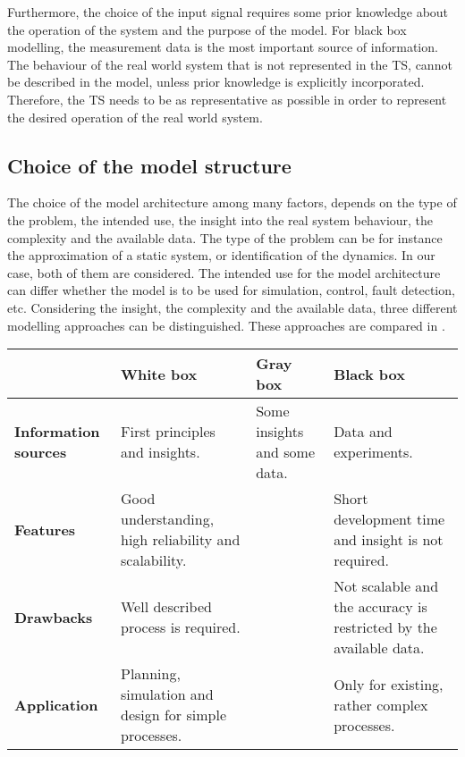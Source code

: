 Furthermore, the choice of the input signal requires some prior knowledge about the operation of the system and the purpose of the model. For black box modelling, the measurement data is the most important source of information. The behaviour of the real world system that is not represented in the TS, cannot be described in the model, unless prior knowledge is explicitly incorporated. Therefore, the TS needs to be as representative as possible in order to represent the desired operation of the real world system. 

\subsection{Choice of the model structure}
\label{choice_of_the_model_architecture}

The choice of the model architecture among many factors, depends on the type of the problem, the intended use, the insight into the real system behaviour, the complexity and the available data. The type of the problem can be for instance the approximation of a static system, or identification of the dynamics. In our case, both of them are considered. The intended use for the model architecture can differ whether the model is to be used for simulation, control, fault detection, etc. Considering the insight, the complexity and the available data, three different modelling approaches can be distinguished\cite{nelles2013nonlinear}. These approaches are compared in . 

\vspace{-3mm}

\begin{center}
    \begin{tabular}{ | >{\centering\arraybackslash}m{1.8cm} | >{\centering\arraybackslash}m{3.6cm} | >{\centering\arraybackslash}m{3.6cm} | >{\centering\arraybackslash}m{3.6cm} |}
    \hline
    \multirow{1}{*}
     & \textbf{White box} & \textbf{Gray box} & \textbf{Black box} \\ 
     \hline
     \multirow{1}{*}
    \textbf{Information sources} & First principles and insights. &  Some insights and some data. & Data and experiments.\\ 
    \hline
      \multirow{1}{*}
    \textbf{Features} & Good understanding, high reliability and scalability. &  & Short development time and insight is not required.\\ 
    \hline
      \multirow{1}{*}
    \textbf{Drawbacks} & Well described process is required. &  & Not scalable and the accuracy is restricted by the available data.\\ 
    \hline
          \multirow{1}{*}
    \textbf{Application} & Planning, simulation and design for simple processes. &  & Only for existing, rather complex processes.\\ 
    \hline
    \end{tabular}
    \label{comparisontable_sysid}
\end{center}


